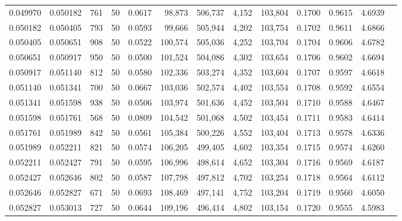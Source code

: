 \begin{tabular}{rrrrrrrrrrrrr}
0.049970 & 0.050182 &   761 &  50 &                                     0.0617 &  98,873 & 506,737 &   4,152 & 103,804 & 0.1700 & 0.9615 & 4.6939 \\
0.050182 & 0.050405 &   793 &  50 &                                     0.0593 &  99,666 & 505,944 &   4,202 & 103,754 & 0.1702 & 0.9611 & 4.6866 \\
0.050405 & 0.050651 &   908 &  50 &                                     0.0522 & 100,574 & 505,036 &   4,252 & 103,704 & 0.1704 & 0.9606 & 4.6782 \\
0.050651 & 0.050917 &   950 &  50 &                                     0.0500 & 101,524 & 504,086 &   4,302 & 103,654 & 0.1706 & 0.9602 & 4.6694 \\
0.050917 & 0.051140 &   812 &  50 &                                     0.0580 & 102,336 & 503,274 &   4,352 & 103,604 & 0.1707 & 0.9597 & 4.6618 \\
0.051140 & 0.051341 &   700 &  50 &                                     0.0667 & 103,036 & 502,574 &   4,402 & 103,554 & 0.1708 & 0.9592 & 4.6554 \\
0.051341 & 0.051598 &   938 &  50 &                                     0.0506 & 103,974 & 501,636 &   4,452 & 103,504 & 0.1710 & 0.9588 & 4.6467 \\
0.051598 & 0.051761 &   568 &  50 &                                     0.0809 & 104,542 & 501,068 &   4,502 & 103,454 & 0.1711 & 0.9583 & 4.6414 \\
0.051761 & 0.051989 &   842 &  50 &                                     0.0561 & 105,384 & 500,226 &   4,552 & 103,404 & 0.1713 & 0.9578 & 4.6336 \\
0.051989 & 0.052211 &   821 &  50 &                                     0.0574 & 106,205 & 499,405 &   4,602 & 103,354 & 0.1715 & 0.9574 & 4.6260 \\
0.052211 & 0.052427 &   791 &  50 &                                     0.0595 & 106,996 & 498,614 &   4,652 & 103,304 & 0.1716 & 0.9569 & 4.6187 \\
0.052427 & 0.052646 &   802 &  50 &                                     0.0587 & 107,798 & 497,812 &   4,702 & 103,254 & 0.1718 & 0.9564 & 4.6112 \\
0.052646 & 0.052827 &   671 &  50 &                                     0.0693 & 108,469 & 497,141 &   4,752 & 103,204 & 0.1719 & 0.9560 & 4.6050 \\
0.052827 & 0.053013 &   727 &  50 &                                     0.0644 & 109,196 & 496,414 &   4,802 & 103,154 & 0.1720 & 0.9555 & 4.5983 \\

\end{tabular}
